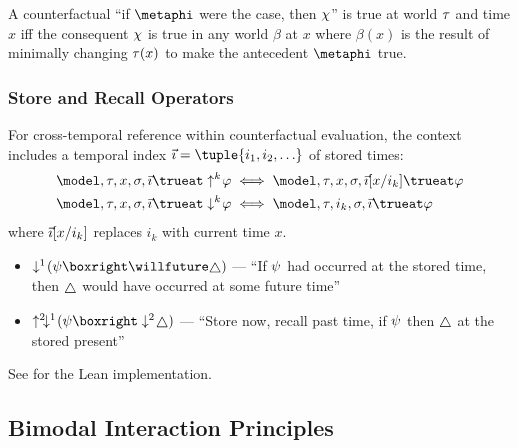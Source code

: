 \documentclass[../LogosReference.tex]{subfiles}
\begin{document}
\begin{remark}
	A counterfactual ``if $\metaphi$ were the case, then $\chi$'' is true at world $\tau$ and time $x$
	iff the consequent $\chi$ is true in any world $\beta$ at $x$ where $\beta(x)$ is the result of minimally changing $\tau(x)$ to make the antecedent $\metaphi$ true.
\end{remark}

\subsubsection{Store and Recall Operators}

\begin{definition}\label{def:store-recall-truth}
	For cross-temporal reference within counterfactual evaluation, the context includes a temporal index $\tempindex = \tuple{i_1, i_2, \ldots}$ of stored times:
	\begin{align}
		\model, \history, x, \assignment, \tempindex \trueat \store{k}\metaA  & \iff \model, \history, x, \assignment, \tempindex[x/i_k] \trueat \metaA \\
		\model, \history, x, \assignment, \tempindex \trueat \recall{k}\metaA & \iff \model, \history, i_k, \assignment, \tempindex \trueat \metaA
	\end{align}
	where $\vec{\imath}[x/i_k]$ replaces $i_k$ with current time $x$.
\end{definition}

\begin{example}
	\begin{itemize}
		\item $\recall{1}(\metaB \boxright \willfuture\always)$ --- ``If $\psi$ had occurred at the stored time, then $\always$ would have occurred at some future time''
		\item $\store{2}\recall{1}(\metaB \boxright \recall{2}\always)$ --- ``Store now, recall past time, if $\psi$ then $\always$ at the stored present''
	\end{itemize}
\end{example}

See  for the Lean implementation.


\subsection{Bimodal Interaction Principles}\label{sec:bimodal-interaction}
\end{document}

